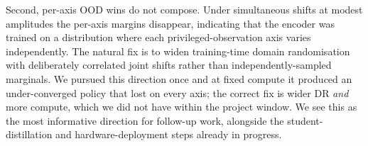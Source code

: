 \documentclass{article}
\begin{document}
Second, per-axis OOD wins do not compose. Under simultaneous shifts at
modest amplitudes the per-axis margins disappear, indicating that the
encoder was trained on a distribution where each privileged-observation
axis varies independently. The natural fix is to widen training-time
domain randomisation with deliberately correlated joint shifts rather than
independently-sampled marginals. We pursued this direction once and at
fixed compute it produced an under-converged policy that lost on every
axis; the correct fix is wider DR \emph{and} more compute, which we did
not have within the project window. We see this as the most informative
direction for follow-up work, alongside the student-distillation and
hardware-deployment steps already in progress.



\end{document}
